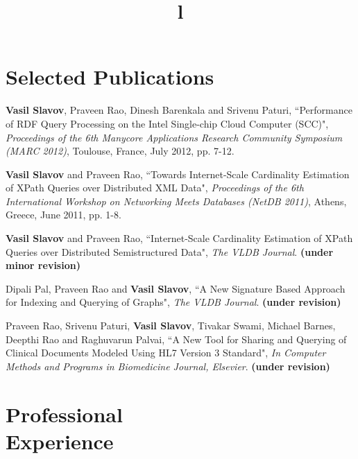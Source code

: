\documentclass[margin,line]{resume}
\begin{document}
\begin{resume}
    \section{\mysidestyle Selected Publications}

    \textbf{Vasil Slavov}, Praveen Rao, Dinesh Barenkala and Srivenu Paturi,
    ``Performance of RDF Query Processing on the Intel Single-chip Cloud Computer (SCC)",
    \textsl{Proceedings of the 6th Manycore Applications Research Community Symposium (MARC 2012)}, Toulouse, France, July 2012, pp. 7-12.
    
\vspace{-2mm}
    \textbf{Vasil Slavov} and Praveen Rao,
    ``Towards Internet-Scale Cardinality Estimation of XPath Queries over Distributed XML Data",
    \textsl{Proceedings of the 6th International Workshop on Networking Meets Databases (NetDB 2011)}, Athens, Greece, June 2011, pp. 1-8.

\vspace{-2mm}
    \textbf{Vasil Slavov} and Praveen Rao,
    ``Internet-Scale Cardinality Estimation of XPath Queries over Distributed Semistructured Data",
    \textsl{The VLDB Journal}. \textbf{(under minor revision)}

\vspace{-2mm}
    Dipali Pal, Praveen Rao and \textbf{Vasil Slavov},
    ``A New Signature Based Approach for Indexing and Querying of Graphs",
    \textsl{The VLDB Journal}. \textbf{(under revision)}
    
\vspace{-2mm}
    Praveen Rao, Srivenu Paturi, \textbf{Vasil Slavov}, Tivakar Swami, Michael Barnes, Deepthi Rao and Raghuvarun Palvai,
    ``A New Tool for Sharing and Querying of Clinical Documents Modeled Using HL7 Version 3 Standard",
    \textsl{In Computer Methods and Programs in Biomedicine Journal, Elsevier}. \textbf{(under revision)}
    
    \section{\mysidestyle Professional\\Experience}
    
    \begin{format}
    \title{l}\\
    \\
    \end{format}


\end{resume}
\end{document}
